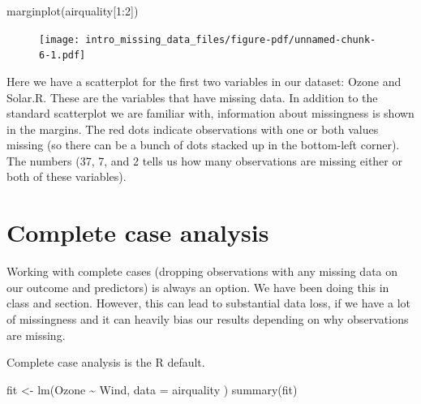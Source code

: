 \documentclass[
  letterpaper,
  DIV=11,
  numbers=noendperiod]{scrreprt}
\newenvironment{Shaded}{\begin{snugshade}}{\end{snugshade}}
\newcommand{\AttributeTok}[1]{\textcolor[rgb]{0.49,0.56,0.16}{#1}}
\newcommand{\DecValTok}[1]{\textcolor[rgb]{0.25,0.63,0.44}{#1}}
\newcommand{\FunctionTok}[1]{\textcolor[rgb]{0.02,0.16,0.49}{#1}}
\newcommand{\NormalTok}[1]{\textcolor[rgb]{0.00,0.44,0.13}{#1}}
\newcommand{\OtherTok}[1]{\textcolor[rgb]{0.00,0.44,0.13}{#1}}
\newcommand{\SpecialCharTok}[1]{\textcolor[rgb]{0.25,0.44,0.63}{#1}}
\begin{document}
\begin{Shaded}
\begin{Highlighting}[]
  \FunctionTok{marginplot}\NormalTok{(airquality[}\DecValTok{1}\SpecialCharTok{:}\DecValTok{2}\NormalTok{])}
\end{Highlighting}
\end{Shaded}

\begin{figure}[H]

{\centering \texttt{[image: intro\_missing\_data\_files/figure-pdf/unnamed-chunk-6-1.pdf]}

}

\end{figure}

Here we have a scatterplot for the first two variables in our dataset:
Ozone and Solar.R. These are the variables that have missing data. In
addition to the standard scatterplot we are familiar with, information
about missingness is shown in the margins. The red dots indicate
observations with one or both values missing (so there can be a bunch of
dots stacked up in the bottom-left corner). The numbers (37, 7, and 2
tells us how many observations are missing either or both of these
variables).

\newpage

\hypertarget{complete-case-analysis}{%
\section{Complete case analysis}\label{complete-case-analysis}}

Working with complete cases (dropping observations with any missing data
on our outcome and predictors) is always an option. We have been doing
this in class and section. However, this can lead to substantial data
loss, if we have a lot of missingness and it can heavily bias our
results depending on why observations are missing.

Complete case analysis is the R default.

\begin{Shaded}
\begin{Highlighting}[]
\NormalTok{  fit }\OtherTok{\textless{}{-}} \FunctionTok{lm}\NormalTok{(Ozone }\SpecialCharTok{\textasciitilde{}}\NormalTok{ Wind, }\AttributeTok{data =}\NormalTok{ airquality )}
  \FunctionTok{summary}\NormalTok{(fit)}
\end{Highlighting}
\end{Shaded}
\end{document}
